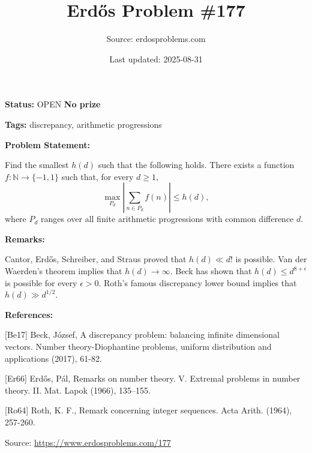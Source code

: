 \documentclass{article}
\title{Erd\H{o}s Problem \#177}
\date{Last updated: 2025-08-31}
\author{Source: erdosproblems.com}
\begin{document}
\maketitle

\noindent\textbf{Status:} OPEN \quad \textbf{No prize}

\noindent\textbf{Tags:} discrepancy, arithmetic progressions

\medskip
\noindent\textbf{Problem Statement:}

Find the smallest $h(d)$ such that the following holds. There exists a function $f:\mathbb{N}\to\{-1,1\}$ such that, for every $d\geq 1$,\[\max_{P_d}\left\lvert \sum_{n\in P_d}f(n)\right\rvert\leq h(d),\]where $P_d$ ranges over all finite arithmetic progressions with common difference $d$.

\bigskip
\noindent\textbf{Remarks:}

Cantor, Erd\H{o}s, Schreiber, and Straus \cite{Er66} proved that $h(d)\ll d!$ is possible. Van der Waerden's theorem implies that $h(d)\to \infty$. Beck \cite{Be17} has shown that $h(d) \leq d^{8+\epsilon}$ is possible for every $\epsilon>0$. Roth's famous discrepancy lower bound \cite{Ro64} implies that $h(d)\gg d^{1/2}$.

\bigskip
\noindent\textbf{References:}

[Be17] Beck, J\'{o}zsef, A discrepancy problem: balancing infinite dimensional vectors. Number theory-Diophantine problems, uniform distribution
and applications (2017), 61-82.
 
 [Er66] Erd\H{o}s, P\'{a}l, Remarks on number theory. {V}. {E}xtremal problems in number
theory. {II}. Mat. Lapok (1966), 135--155.
 
 [Ro64] Roth, K. F., Remark concerning integer sequences. Acta Arith. (1964), 257-260.

\bigskip
\noindent\small{Source: \url{https://www.erdosproblems.com/177}}
\end{document}
